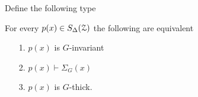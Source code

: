 



Define the following type




\begin{theorem}\label{thm_syndetic_invariant}
  For every $p(x)\in S_\Delta(\EuScript Z)$ the following are equivalent
  \begin{itemize}
    \item[1.] $p(x)$ is $G$-invariant
    \item[2.] $p(x)\vdash\Sigma_G(x)$
    \item[3.] $p(x)$ is $G$-thick.
  \end{itemize}
\end{theorem}

